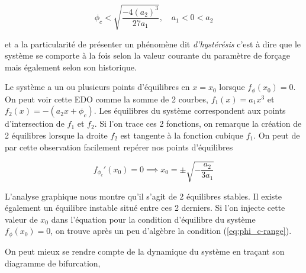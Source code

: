 \begin{equation} \label{eq:phi_c-range}
  \phi_c < \sqrt{\frac{-4(a_2)^3}{27a_1}}, \quad a_1 < 0 < a_2
\end{equation}

et a la particularité de présenter un phénomène dit \emph{d'hystérésis} c'est à dire que le système se comporte à la fois selon la valeur courante du paramètre de forçage mais également selon son historique.


Le système a un ou plusieurs points d'équilibres en $x = x_0$ lorsque $f_{\phi}(x_0) = 0$. On peut voir cette EDO comme la somme de 2 courbes, $f_1(x) = a_1 x^3$ et $f_2(x) = - (a_2x + \phi_c)$. Les équilibres du système correspondent aux points d'intersection de $f_1$ et $f_2$. Si l'on trace ces 2 fonctions, on remarque la création de 2 équilibres lorsque la droite $f_2$ est tangente à la fonction cubique $f_1$. On peut de par cette observation facilement repérer nos points d'équilibres

\begin{equation}
  f_{\phi_c}'(x_0) = 0 \implies x_0 = \pm \sqrt{-\frac{a_2}{3a_1}}
\end{equation}

L'analyse graphique nous montre qu'il s'agit de 2 équilibres stables. Il existe également un équilibre instable situé entre ces 2 derniers.
Si l'on injecte cette valeur de $x_0$ dans l'équation pour la condition d'équilibre du système $f_{\phi}(x_0) = 0$, on trouve après un peu d'algèbre la condition (\ref{eq:phi_c-range}).


On peut mieux se rendre compte de la dynamique du système en traçant son diagramme de bifurcation,


